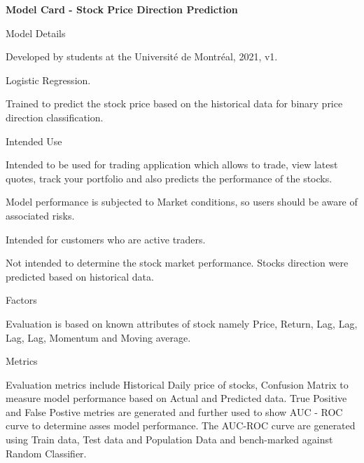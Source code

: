 \documentclass{article}
\begin{document}
\begin{adjustwidth}{-90pt}{-80pt}
\begin{singlespace}

\begin{tcolorbox}[breakable, sharp corners, boxrule=0.7pt]
\begin{center}
    \large\textbf{Model Card - Stock Price Direction Prediction}
\end{center}
\small{
\begin{multicols}{2}
\begin{mcsection}{Model Details}
    \item Developed by students at the Université de Montréal, 2021, v1.
    \item Logistic Regression.
    \item Trained to predict the stock price based on the historical data for binary price direction classification.
\end{mcsection}

\begin{mcsection}{Intended Use}
    \item Intended to be used for trading application which allows to trade, view latest quotes, track your portfolio and also predicts the performance of the stocks.
    \item Model performance is subjected to Market conditions, so users should be aware of associated risks.
    \item Intended for customers who are active traders.
    \item Not intended to determine the stock market performance. Stocks direction were predicted based on historical data.
\end{mcsection}

\begin{mcsection}{Factors}
    \item Evaluation is based on known attributes of stock namely Price, Return, Lag, Lag, Lag, Lag, Momentum and Moving average.
\end{mcsection}

\begin{mcsection}{Metrics}
    \item Evaluation metrics include Historical Daily price of stocks, Confusion Matrix to measure model performance based on Actual and Predicted data. True Positive and False Postive metries are generated and further used to show AUC - ROC curve to determine asses model performance. The AUC-ROC curve are generated using Train data, Test data and Population Data and bench-marked against Random Classifier.
\end{mcsection}


\end{multicols}}
\end{tcolorbox}
\end{singlespace}
\end{adjustwidth}
\end{document}
